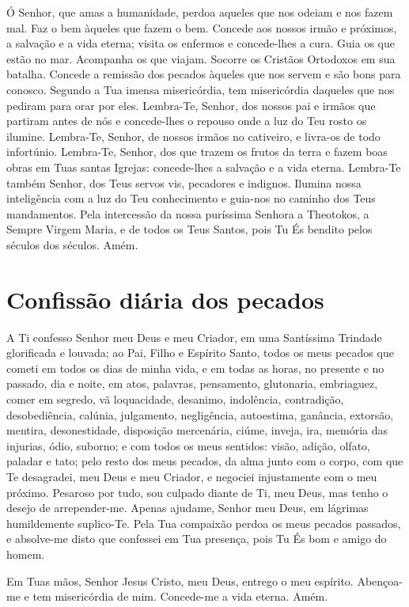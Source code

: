 \documentclass{subfiles}
\begin{document}
Ó Senhor, que amas a humanidade, perdoa aqueles que nos odeiam e nos fazem mal.
Faz o bem àqueles que fazem o bem. Concede aos nossos irmão e próximos, a
salvação e a vida eterna; visita os enfermos e concede-lhes a cura. Guia os que
estão no mar. Acompanha os que viajam. Socorre os Cristãos Ortodoxos em sua
batalha. Concede a remissão dos pecados àqueles que nos servem e são bons para
conosco. Segundo a Tua imensa misericórdia, tem misericórdia daqueles que nos
pediram para orar por eles. Lembra-Te, Senhor, dos nossos pai e irmãos que
partiram antes de nós e concede-lhes o repouso onde a luz do Teu rosto os
ilumine. Lembra-Te, Senhor, de nossos irmãos no cativeiro, e livra-os de todo
infortúnio. Lembra-Te, Senhor, dos que trazem os frutos da terra e fazem boas
obras em Tuas santas Igrejas: concede-lhes a salvação e a vida eterna. Lembra-Te
também Senhor, dos Teus servos vis, pecadores e indignos. Ilumina nossa
inteligência com a luz do Teu conhecimento e guia-nos no caminho dos Teus
mandamentos. Pela intercessão da nossa puríssima Senhora a Theotokos, a Sempre
Virgem Maria, e de todos os Teus Santos, pois Tu És bendito pelos séculos dos
séculos. Amém.


\section*{Confissão diária dos pecados}

A Ti confesso Senhor meu Deus e meu Criador, em uma Santíssima Trindade
glorificada e louvada; ao Pai, Filho e Espírito Santo, todos os meus pecados que
cometi em todos os dias de minha vida, e em todas as horas, no presente e no
passado, dia e noite, em atos, palavras, pensamento, glutonaria, embriaguez,
comer em segredo, vã loquacidade, desanimo, indolência, contradição,
desobediência, calúnia, julgamento, negligência, autoestima, ganância, extorsão,
mentira, desonestidade, disposição mercenária, ciúme, inveja, ira, memória das
injurias, ódio, suborno; e com todos os meus sentidos: visão, adição, olfato,
paladar e tato; pelo resto dos meus pecados, da alma junto com o corpo, com que
Te desagradei, meu Deus e meu Criador, e negociei injustamente com o meu
próximo. Pesaroso por tudo, sou culpado diante de Ti, meu Deus, mas tenho o
desejo de arrepender-me. Apenas ajudame, Senhor meu Deus, em lágrimas
humildemente suplico-Te. Pela Tua compaixão perdoa os meus pecados passados, e
absolve-me disto que confessei em Tua presença, pois Tu És bom e amigo do homem.


Em Tuas mãos, Senhor Jesus Cristo, meu Deus, entrego o meu espírito.
Abençoa-me e tem misericórdia de mim. Concede-me a vida eterna. Amém.
\end{document}
